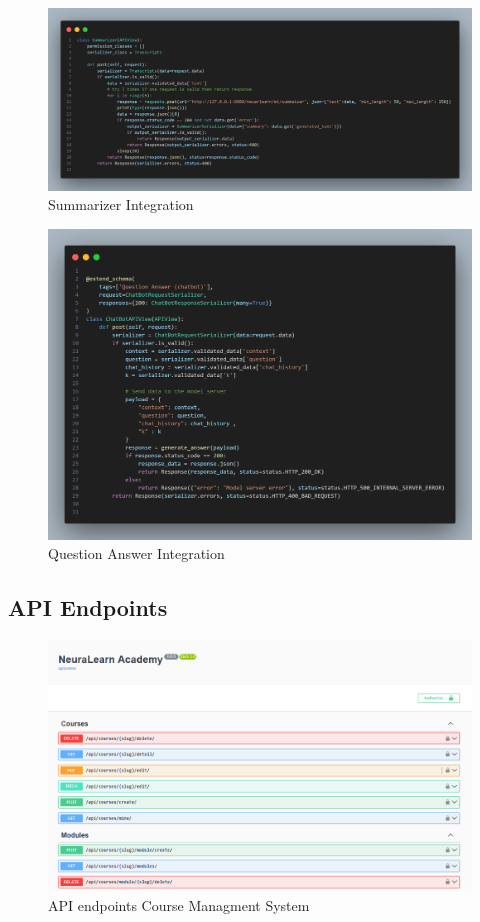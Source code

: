 \begin{figure}[h!]
	\centering
	\includegraphics[max height=\textheight,max width=\textwidth]{figures/srccode/summarizer.png}
	\caption{Summarizer Integration}
\end{figure}

\begin{figure}[h!]
	\centering
	\includegraphics[max height=\textheight,max width=\textwidth]{figures/srccode/Question-answer.png}
	\caption{Question Answer Integration}
\end{figure}

\FloatBarrier
\subsection{API Endpoints}
	
\begin{figure}[h!]
	\centering
	\includegraphics[max height=\textheight,max width=\textwidth]{figures/swagger.png}
	\caption{API endpoints Course Managment System}
\end{figure}
	
